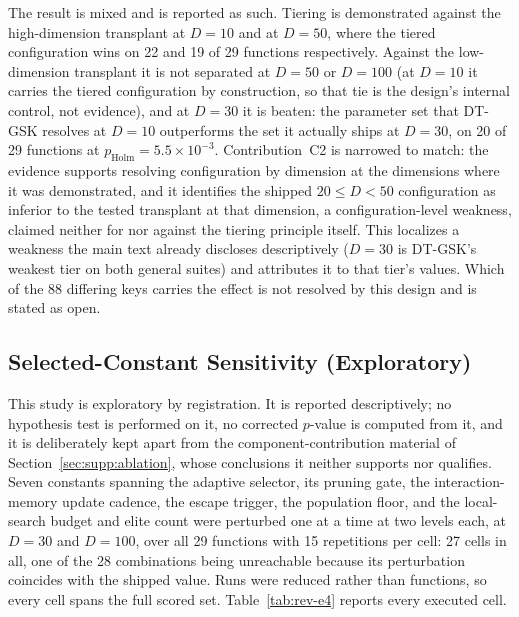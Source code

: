 \documentclass[algorithms,article,submit,moreauthors,pdftex]{Definitions/mdpi}
\newcommand{\dtgsk}{DT-GSK}
\begin{document}
The result is mixed and is reported as such.  Tiering is demonstrated against
the high-dimension transplant at $D = 10$ and at $D = 50$, where the tiered
configuration wins on 22 and 19 of 29 functions respectively.  Against the
low-dimension transplant it is not separated at $D = 50$ or $D = 100$ (at
$D = 10$ it carries the tiered configuration by construction, so that tie is
the design's internal control, not evidence), and at $D = 30$ it is beaten: the parameter set that \dtgsk{} resolves at $D = 10$
outperforms the set it actually ships at $D = 30$, on 20 of 29 functions at
$p_{\mathrm{Holm}} = 5.5\times10^{-3}$.  Contribution~C2 is narrowed to match:
the evidence supports resolving configuration by dimension at the dimensions
where it was demonstrated, and it identifies the shipped $20 \le D < 50$
configuration as inferior to the tested transplant at that dimension, a
configuration-level weakness, claimed neither for nor against the tiering
principle itself.  This localizes a
weakness the main text already discloses descriptively ($D = 30$
is \dtgsk{}'s weakest tier on both general suites) and attributes it to that
tier's values.  Which of the 88 differing keys carries the effect is not
resolved by this design and is stated as open.

\subsection{Selected-Constant Sensitivity (Exploratory)}\label{sec:supp:rev:sensitivity}

This study is exploratory by registration.  It is reported descriptively; no
hypothesis test is performed on it, no corrected $p$-value is computed from it,
and it is deliberately kept apart from the component-contribution material of
Section~\ref{sec:supp:ablation}, whose conclusions it neither supports nor
qualifies.  Seven constants spanning the adaptive selector, its pruning gate,
the interaction-memory update cadence,
the escape trigger, the population floor, and the local-search budget and elite
count were perturbed one at a time at two levels each, at $D = 30$ and
$D = 100$, over all 29 functions with 15 repetitions per cell: 27 cells in all,
one of the 28 combinations being unreachable because its perturbation coincides
with the shipped value.  Runs were reduced rather than functions, so every cell
spans the full scored set.  Table~\ref{tab:rev-e4} reports every executed cell.
\end{document}
